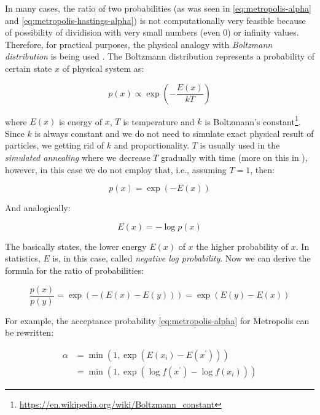 \documentclass[
  digital, %
  oneside, %
  lof,     %
  lot,     %
]{fithesis4}
\begin{document}
In many cases, the ratio of 
two probabilities (as was seen in 
\eqref{eq:metropolis-alpha} and \eqref{eq:metropolis-hastings-alpha}) is not
computationally very feasible because of possibility of dividision 
with very small numbers (even $0$) or infinity values.
Therefore, for practical purposes, the physical analogy with 
\textit{Boltzmann distribution} is being used \cite{murphy2021}.
The Boltzmann distribution represents a probability of 
certain state $x$ of physical system as:

\begin{equation}\label{eq:boltzmann-factor-prop}
  p(x) \propto \exp \left( -\frac{E(x)}{kT} \right)
\end{equation}

where $E(x)$ is energy of $x$, $T$ is 
temperature and $k$ is Boltzmann's constant\footnote{\url{https://en.wikipedia.org/wiki/Boltzmann_constant}}.
Since $k$ is always constant and we do not need 
to simulate exact physical result of particles, 
we getting rid of $k$ and proportionality.
$T$ is usually used in the \textit{simulated annealing} where we
decrease $T$ gradually with time (more on this in \cite[Chapter 8]{murphy2021}),
however, in this case we do not employ that, i.e., assuming $T = 1$, then:

\begin{equation}\label{eq:boltzmann-factor-prob}
  p(x) = \exp \left( -E(x) \right)
\end{equation}

And analogically:

\begin{equation}\label{eq:boltzmann-factor-neg-log}
  E(x) = -\log p(x)
\end{equation}

The basically states, the lower energy $E(x)$ of $x$ the higher probability of $x$.
In statistics, $E$ is, in this case, called \textit{negative log probability}.
Now we can derive the formula for the ratio of probabilities:

\begin{equation}
  \frac{p(x)}{p(y)} = \exp \left( -(E(x) - E(y)) \right) = \exp \left( E(y) - E(x) \right)
\end{equation}

For example, the acceptance probability \eqref{eq:metropolis-alpha} for Metropolis can be rewritten:

\begin{equation}
  \begin{split}
    \alpha &= \min \left(
    1, 
    \exp\left( 
      E(x_{i}) - E(x^\prime)
    \right) 
  \right) \\
  & = \min \left(
    1, 
    \exp\left( 
      \log f(x^\prime) - \log f(x_{i})
    \right) 
  \right)
  \end{split}
\end{equation}
\end{document}
